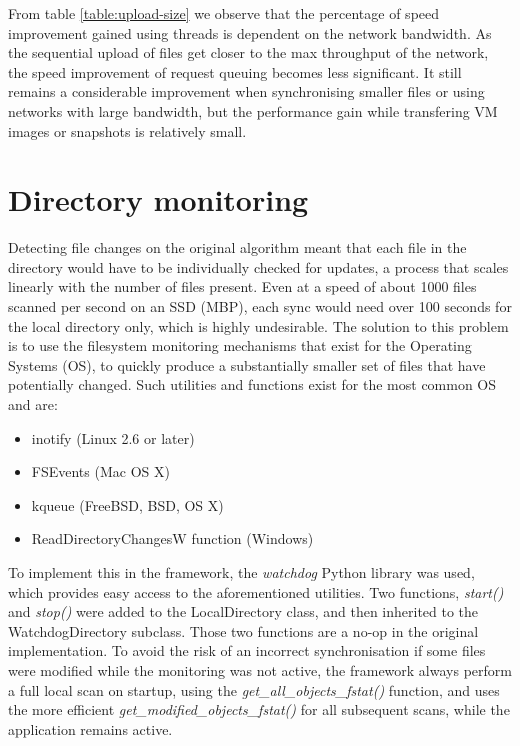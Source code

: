       From table \ref{table:upload-size} we observe that the percentage of speed improvement gained using threads is dependent on the network bandwidth. As the sequential upload of files get closer to the max throughput of the network, the speed improvement of request queuing becomes less significant. It still remains a considerable improvement when synchronising smaller files or using networks with large bandwidth, but the performance gain while transfering VM images or snapshots is relatively small.

\section{Directory monitoring}
  \label{sec:dir_monitoring}
  Detecting file changes on the original algorithm meant that each file in the directory would have to be individually checked for updates, a process that scales linearly with the number of files present. Even at a speed of about 1000 files scanned per second on an SSD (MBP), each sync would need over 100 seconds for the local directory only, which is highly undesirable. The solution to this problem is to use the filesystem monitoring mechanisms that exist for the Operating Systems (OS), to quickly produce a substantially smaller set of files that have potentially changed. Such utilities and functions exist for the most common OS and are:
  \begin{itemize}
    \item inotify (Linux 2.6 or later)
    \item FSEvents (Mac OS X)
    \item kqueue (FreeBSD, BSD, OS X)
    \item ReadDirectoryChangesW function (Windows)
  \end{itemize}

  To implement this in the framework, the \emph{watchdog} Python library was used, which provides easy access to the aforementioned utilities. Two functions, \emph{start()} and \emph{stop()} were added to the LocalDirectory class, and then inherited to the WatchdogDirectory subclass. Those two functions are a no-op in the original implementation. To avoid the risk of an incorrect synchronisation if some files were modified while the monitoring was not active, the framework always perform a full local scan on startup, using the \emph{get\_all\_objects\_fstat()} function, and uses the more efficient \emph{get\_modified\_objects\_fstat()} for all subsequent scans, while the application remains active.

